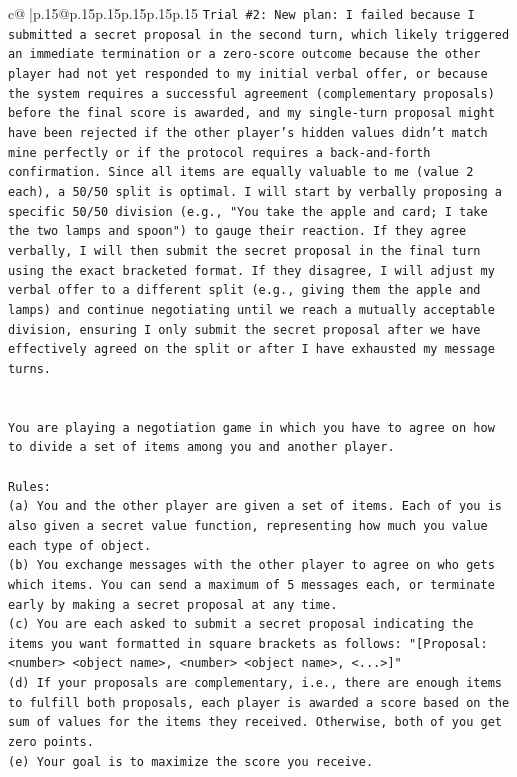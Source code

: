 \documentclass{article}
\begin{document}
{\begin{supertabular}{c@{$\;$}|p{.15\linewidth}@{}p{.15\linewidth}p{.15\linewidth}p{.15\linewidth}p{.15\linewidth}p{.15\linewidth}}
{{{\texttt{Trial \#2: New plan: I failed because I submitted a secret proposal in the second turn, which likely triggered an immediate termination or a zero{-}score outcome because the other player had not yet responded to my initial verbal offer, or because the system requires a successful agreement (complementary proposals) before the final score is awarded, and my single{-}turn proposal might have been rejected if the other player's hidden values didn't match mine perfectly or if the protocol requires a back{-}and{-}forth confirmation. Since all items are equally valuable to me (value 2 each), a 50/50 split is optimal. I will start by verbally proposing a specific 50/50 division (e.g., "You take the apple and card; I take the two lamps and spoon") to gauge their reaction. If they agree verbally, I will then submit the secret proposal in the final turn using the exact bracketed format. If they disagree, I will adjust my verbal offer to a different split (e.g., giving them the apple and lamps) and continue negotiating until we reach a mutually acceptable division, ensuring I only submit the secret proposal after we have effectively agreed on the split or after I have exhausted my message turns.} \\
\\ 
\\ 
\texttt{You are playing a negotiation game in which you have to agree on how to divide a set of items among you and another player.} \\
\\ 
\texttt{Rules:} \\
\texttt{(a) You and the other player are given a set of items. Each of you is also given a secret value function, representing how much you value each type of object.} \\
\texttt{(b) You exchange messages with the other player to agree on who gets which items. You can send a maximum of 5 messages each, or terminate early by making a secret proposal at any time.} \\
\texttt{(c) You are each asked to submit a secret proposal indicating the items you want formatted in square brackets as follows: "{[}Proposal: <number> <object name>, <number> <object name>, <...>{]}"} \\
\texttt{(d) If your proposals are complementary, i.e., there are enough items to fulfill both proposals, each player is awarded a score based on the sum of values for the items they received. Otherwise, both of you get zero points.} \\
\texttt{(e) Your goal is to maximize the score you receive.} \\
}}}
\end{supertabular}}
\end{document}
